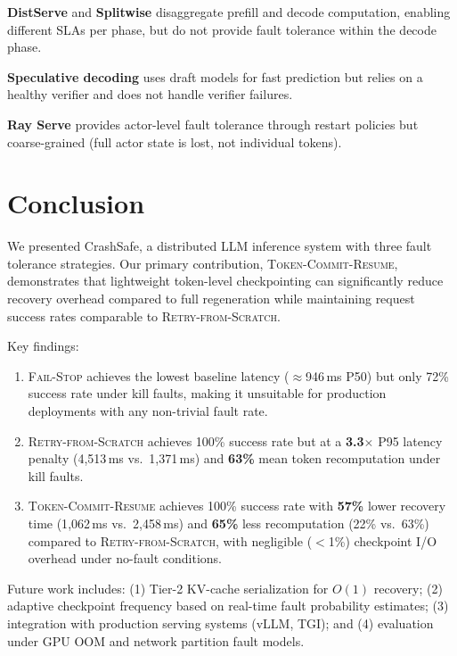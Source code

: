 \documentclass[10pt,twocolumn]{article}
\newcommand{\sys}{CrashSafe}
\newcommand{\failstop}{\textsc{Fail-Stop}}
\newcommand{\retry}{\textsc{Retry-from-Scratch}}
\newcommand{\tcr}{\textsc{Token-Commit-Resume}}
\begin{document}
\textbf{DistServe} \cite{zhong2024distserve} and \textbf{Splitwise}
\cite{patel2024splitwise} disaggregate prefill and decode computation,
enabling different SLAs per phase, but do not provide fault tolerance
within the decode phase.

\textbf{Speculative decoding} \cite{leviathan2023speculative, chen2023accelerating}
uses draft models for fast prediction but relies on a healthy verifier and
does not handle verifier failures.

\textbf{Ray Serve} \cite{moritz2018ray} provides actor-level fault tolerance
through restart policies but coarse-grained (full actor state is lost, not
individual tokens).

\section{Conclusion}
\label{sec:conclusion}

We presented \sys{}, a distributed LLM inference system with three
fault tolerance strategies. Our primary contribution, \tcr{}, demonstrates
that lightweight token-level checkpointing can significantly reduce recovery
overhead compared to full regeneration while maintaining request success rates
comparable to \retry{}.

Key findings:
\begin{enumerate}[leftmargin=*,itemsep=0pt]
  \item \failstop{} achieves the lowest baseline latency ($\approx$946\,ms P50)
    but only 72\% success rate under kill faults, making it unsuitable for
    production deployments with any non-trivial fault rate.
  \item \retry{} achieves 100\% success rate but at a \textbf{3.3$\times$}
    P95 latency penalty (4{,}513\,ms vs.\ 1{,}371\,ms) and \textbf{63\%}
    mean token recomputation under kill faults.
  \item \tcr{} achieves 100\% success rate with \textbf{57\%} lower recovery
    time (1{,}062\,ms vs.\ 2{,}458\,ms) and \textbf{65\%} less recomputation
    (22\% vs.\ 63\%) compared to \retry{}, with negligible ($<$1\%) checkpoint
    I/O overhead under no-fault conditions.
\end{enumerate}

Future work includes: (1) Tier-2 KV-cache serialization for $O(1)$ recovery;
(2) adaptive checkpoint frequency based on real-time fault probability
estimates; (3) integration with production serving systems (vLLM, TGI);
and (4) evaluation under GPU OOM and network partition fault models.
\end{document}
